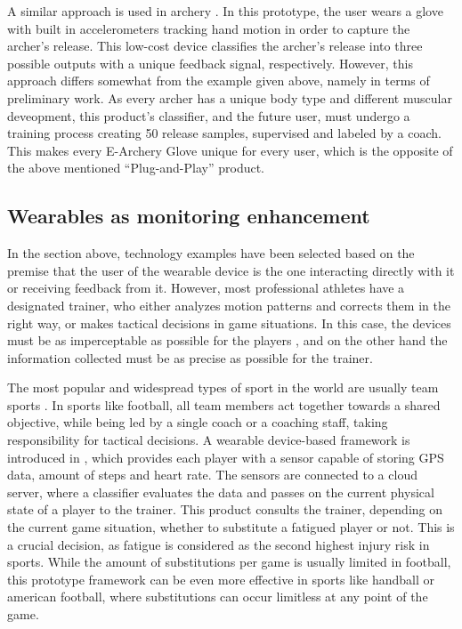 \documentclass[sigconf]{acmart}
\begin{document}
		\par A similar approach is used in archery \cite{EArchery}. In this prototype, the user wears a glove with built in accelerometers tracking hand motion in order to capture the archer's release. This low-cost device classifies the archer's release into three possible outputs with a unique feedback signal, respectively. However, this approach differs somewhat from the example given above, namely in terms of preliminary work. As every archer has a unique body type and different muscular deveopment, this product's classifier, and the future user, must undergo a training process creating 50 release samples, supervised and labeled by a coach. This makes every E-Archery Glove unique for every user, which is the opposite of the above mentioned ``Plug-and-Play'' product.
		
		\subsection{Wearables as monitoring enhancement}
		In the section above, technology examples have been selected based on the premise that the user of the wearable device is the one interacting directly with it or receiving feedback from it. However, most professional athletes have a designated trainer, who either analyzes motion patterns and corrects them in the right way, or makes tactical decisions in game situations. In this case, the devices must be as imperceptable as possible for the players \cite{SportSensing}, and on the other hand the information collected must be as precise as possible for the trainer.
		
		\par The most popular and widespread types of sport in the world are usually team sports \cite{Popularity}. In sports like football, all team members act together towards a shared objective, while being led by a single coach or a coaching staff, taking responsibility for tactical decisions. A wearable device-based framework is introduced in \cite{FootballPitch}, which provides each player with a sensor capable of storing GPS data, amount of steps and heart rate. The sensors are connected to a cloud server, where a classifier evaluates the data and passes on the current physical state of a player to the trainer. This product consults the trainer, depending on the current game situation, whether to substitute a fatigued player or not. This is a crucial decision, as fatigue is considered as the second highest injury risk in sports. While the amount of substitutions per game is usually limited in football, this prototype framework can be even more effective in sports like handball or american football, where substitutions can occur limitless at any point of the game.
		
\end{document}
